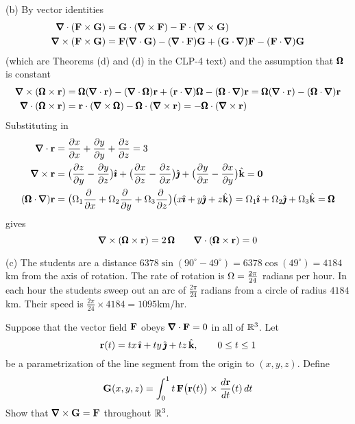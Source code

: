 \begin{solution}
(b) By vector identities 
\begin{align*}
\vnabla\cdot(\vF\times\vG)
   &=\vG\cdot(\vnabla\times\vF)-\vF\cdot(\vnabla\times\vG)\\
\vnabla\times(\vF\times\vG)
   &=\vF(\vnabla\cdot\vG)-(\vnabla\cdot\vF)\vG
+(\vG\cdot\vnabla)\vF-(\vF\cdot\vnabla)\vG
\end{align*} 
(which are Theorems (d)  
and (d) in the CLP-4 text)
and the assumption that $\pmb{\Omega}$ is constant
\begin{align*}
\vnabla\times(\vOm\times\vr)&=
\vOm(\vnabla\cdot\vr)-(\vnabla\cdot\vOm)\vr
+(\vr\cdot\vnabla)\vOm-(\vOm\cdot\vnabla)\vr
=\vOm(\vnabla\cdot\vr)-(\vOm\cdot\vnabla)\vr\\
\vnabla\cdot(\vOm\times\vr)&=
\vr\cdot(\vnabla\times\vOm)-
\vOm\cdot(\vnabla\times\vr)
=-\vOm\cdot(\vnabla\times\vr)
\end{align*}
Substituting in
\begin{align*}
\vnabla\cdot\vr&=\pdiff{x}{x}+
\pdiff{y}{y}+\pdiff{z}{z}=3\\
\vnabla\times\vr
&=\big(\pdiff{z}{y}-\pdiff{y}{z}\big)\hi+
\big(\pdiff{x}{z}-\pdiff{z}{x}\big)\hj
+\big(\pdiff{y}{x}-\pdiff{x}{y}\big)\hk
=\vZero\\
(\vOm\cdot\vnabla)\vr&=
\big(\Om_1\pdiff{}{x}
+\Om_2\pdiff{}{y}
+\Om_3\pdiff{}{z}\big)
\big(x\hi+y\hj+z\hk\big)
=\Om_1\hi+\Om_2\hj+\Om_3\hk=\vOm
\end{align*}
gives
\begin{equation*}
\vnabla\times(\vOm\times\vr)=2\,\vOm\qquad \vnabla\cdot(\vOm\times\vr)=0
\end{equation*}

(c)
The students are a distance $6378\sin(90^\circ- 49^\circ)=
6378\cos(49^\circ)=4184$ km from the axis of rotation. The rate of rotation
is $\Omega =\frac{2\pi}{24}$ radians per hour. In each hour the students
sweep out an arc of $\frac{2\pi}{24}$ radians from a circle of radius
$4184$ km. Their speed is $\frac{2\pi}{24}\times 4184=1095$km/hr.
\end{solution}

\begin{question}
Suppose that the vector field $\mathbf{F}$ obeys $\vnabla\cdot \vF=0$ in
all of $\mathbb{R}^3$. Let 
\begin{equation*}
\mathbf{r}(t)=tx\,\hat{\pmb{\imath}}+ty\,\hat{\pmb{\jmath}}+tz\,\hat{\mathbf{k}},\qquad 0\le t\le 1
\end{equation*}
be a parametrization of the line segment from the origin to $(x,y,z)$. Define
\begin{equation*}
\mathbf{G}(x,y,z)=\int_0^1 t\,\mathbf{F}\big(\mathbf{r}(t)\big)\times\frac{d\mathbf{r}}{dt}(t)\,dt
\end{equation*}
Show that $\vnabla\times \vG=\vF$ throughout $\mathbb{R}^3$.
\end{question}

